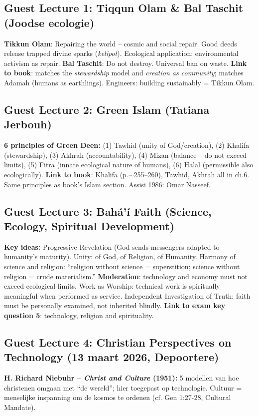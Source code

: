 \documentclass[a4paper,10pt]{article}
\begin{document}
\subsection{Guest Lecture 1: Tiqqun Olam \& Bal Taschit (Joodse ecologie)}
\textbf{Tikkun Olam}: Repairing the world -- cosmic and social repair. Good deeds release trapped divine sparks (\textit{kelipot}). Ecological application: environmental activism as repair. \textbf{Bal Taschit}: Do not destroy. Universal ban on waste. \textbf{Link to book}: matches the \textit{stewardship} model and \textit{creation as community}; matches Adamah (humans as earthlings). Engineers: building sustainably = Tikkun Olam.

\subsection{Guest Lecture 2: Green Islam (Tatiana Jerbouh)}
\textbf{6 principles of Green Deen:} (1) Tawhid (unity of God/creation), (2) Khalifa (stewardship), (3) Akhrah (accountability), (4) Mizan (balance -- do not exceed limits), (5) Fitra (innate ecological nature of humans), (6) Halal (permissible also ecologically). \textbf{Link to book}: Khalifa (p.$\sim$255--260), Tawhid, Akhrah all in ch.6. Same principles as book's Islam section. Assisi 1986: Omar Nasseef.

\subsection{Guest Lecture 3: Bah\'a'\'i Faith (Science, Ecology, Spiritual Development)}
\textbf{Key ideas:} Progressive Revelation (God sends messengers adapted to humanity's maturity). Unity: of God, of Religion, of Humanity. Harmony of science and religion: ``religion without science = superstition; science without religion = crude materialism.'' \textbf{Moderation}: technology and economy must not exceed ecological limits. Work as Worship: technical work is spiritually meaningful when performed as service. Independent Investigation of Truth: faith must be personally examined, not inherited blindly. \textbf{Link to exam key question 5}: technology, religion and spirituality.

\subsection{Guest Lecture 4: Christian Perspectives on Technology (13 maart 2026, Depoortere)}
\textbf{H. Richard Niebuhr -- \textit{Christ and Culture} (1951):} 5 modellen van hoe christenen omgaan met ``de wereld''; hier toegepast op technologie. Cultuur = menselijke inspanning om de kosmos te ordenen (cf. Gen 1:27-28, Cultural Mandate).
\end{document}
